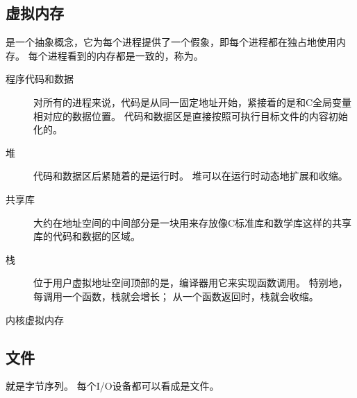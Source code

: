 {    \subsection{虚拟内存}
    {
        是一个抽象概念，它为每个进程提供了一个假象，即每个进程都在独占地使用内存。
        每个进程看到的内存都是一致的，称为。

        \begin{description}
            \item[程序代码和数据]
            {
                对所有的进程来说，代码是从同一固定地址开始，紧接着的是和C全局变量相对应的数据位置。
                代码和数据区是直接按照可执行目标文件的内容初始化的。
            }
            \item[堆]
            {
                代码和数据区后紧随着的是运行时。
                堆可以在运行时动态地扩展和收缩。
            }
            \item[共享库]
            {
                大约在地址空间的中间部分是一块用来存放像C标准库和数学库这样的共享库的代码和数据的区域。
            }
            \item[栈]
            {
                位于用户虚拟地址空间顶部的是，编译器用它来实现函数调用。
                特别地，每调用一个函数，栈就会增长；
                从一个函数返回时，栈就会收缩。
            }
            \item[内核虚拟内存]
        \end{description}
    }

    \subsection{文件}
    {
        就是字节序列。
        每个I/O设备都可以看成是文件。
    }
}
